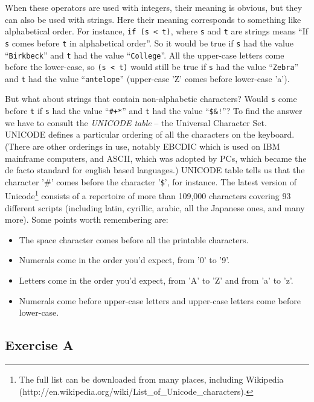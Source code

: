 When these operators are used with integers, their meaning is obvious,
but they can also be used with strings.  Here their meaning corresponds
to something like alphabetical order.  For instance, \verb!if (s < t)!,
where  \verb!s! and \verb!t! are strings means ``If  \verb!s! comes before \verb!t!
in alphabetical order''.  So it would be true if  \verb!s! had the value
``\verb!Birkbeck!'' and \verb!t! had the value ``\verb!College!''.  All the
upper-case letters come before the lower-case, so \verb!(s < t)! would
still be true if  \verb!s! had the value ``\verb!Zebra!'' and \verb!t! had the
value ``\verb!antelope!'' (upper-case 'Z' comes before lower-case 'a').

But what about strings that contain non-alphabetic characters?  Would
\verb!s!  come before \verb!t! if \verb!s! had the value ``\verb!#+*!''
and \verb!t! had the value ``\verb+$&!+''?  To find the answer we have
to consult the \emph{UNICODE table} -- the Universal Character Set.
UNICODE defines a particular ordering of all the characters on the
keyboard.  (There are other orderings in use, notably EBCDIC which is
used on IBM mainframe computers, and ASCII, which was adopted by PCs,
which became the de facto standard for english based languages.)
UNICODE table tells us that the character '\#' comes before the
character '\verb!$!', for instance.  The latest version of Unicode\footnote{The full list can be downloaded from many
places, including Wikipedia
(http://en.wikipedia.org/wiki/List\_of\_Unicode\_characters).}
consists of a repertoire of more than 109,000 characters covering 93
different scripts (including latin, cyrillic, arabic, all the Japanese
ones, and many more). Some points worth remembering are:

\begin{itemize}
\item
The space character comes before all the printable characters.
\item
Numerals come in the order you'd expect, from '0' to '9'.
\item
Letters come in the order you'd expect, from 'A' to 'Z' and from 'a' to 'z'.
\item
Numerals come before upper-case letters and upper-case letters come before lower-case.
\end{itemize}

\subsection*{Exercise A}


